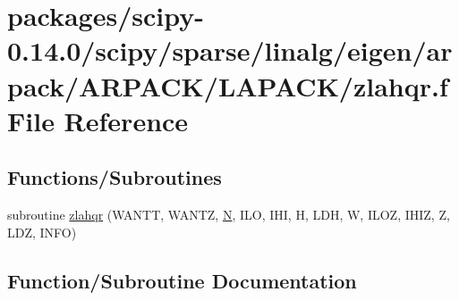\hypertarget{scipy-0_814_80_2scipy_2sparse_2linalg_2eigen_2arpack_2ARPACK_2LAPACK_2zlahqr_8f}{}\section{packages/scipy-\/0.14.0/scipy/sparse/linalg/eigen/arpack/\+A\+R\+P\+A\+C\+K/\+L\+A\+P\+A\+C\+K/zlahqr.f File Reference}
\label{scipy-0_814_80_2scipy_2sparse_2linalg_2eigen_2arpack_2ARPACK_2LAPACK_2zlahqr_8f}
\subsection*{Functions/\+Subroutines}
\begin{DoxyCompactItemize}
\item 
subroutine \hyperlink{scipy-0_814_80_2scipy_2sparse_2linalg_2eigen_2arpack_2ARPACK_2LAPACK_2zlahqr_8f_a32a8dc4443c2f0f528363b99d7a7b7e6}{zlahqr} (W\+A\+N\+T\+T, W\+A\+N\+T\+Z, \hyperlink{polmisc_8c_a0240ac851181b84ac374872dc5434ee4}{N}, I\+L\+O, I\+H\+I, H, L\+D\+H, W, I\+L\+O\+Z, I\+H\+I\+Z, Z, L\+D\+Z, I\+N\+F\+O)
\end{DoxyCompactItemize}


\subsection{Function/\+Subroutine Documentation}
\hypertarget{scipy-0_814_80_2scipy_2sparse_2linalg_2eigen_2arpack_2ARPACK_2LAPACK_2zlahqr_8f_a32a8dc4443c2f0f528363b99d7a7b7e6}{}
